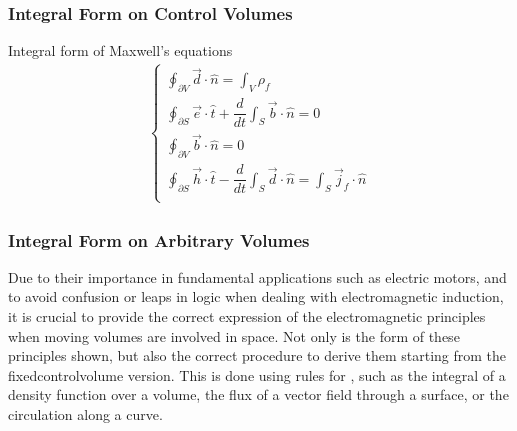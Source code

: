 \documentclass[letterpaper,10pt,english]{jupyterBook}
\begin{document}
\subsubsection{Integral Form on Control Volumes}
\label{\detokenize{ch/principles-matter:integral-form-on-control-volumes}}\label{\detokenize{ch/principles-matter:classical-electromagnetism-media-integral-control-volume}}
\sphinxAtStartPar
Integral form of Maxwell’s equations
\begin{equation*}
\begin{split}\begin{cases}
 \displaystyle \oint_{\partial V} \vec{d} \cdot \hat{n} = \int_{V} \rho_f \\
 \displaystyle \oint_{\partial S} \vec{e} \cdot \hat{t} + \dfrac{d}{dt} \int_S \vec{b} \cdot \hat{n} = 0 \\
 \displaystyle \oint_{\partial V} \vec{b} \cdot \hat{n} = 0 \\
 \displaystyle \oint_{\partial S} \vec{h} \cdot \hat{t} - \dfrac{d}{dt} \int_S \vec{d} \cdot \hat{n} = \int_{S} \vec{j}_f \cdot \hat{n} \\
\end{cases}\end{split}
\end{equation*}

\subsubsection{Integral Form on Arbitrary Volumes}
\label{\detokenize{ch/principles-matter:integral-form-on-arbitrary-volumes}}\label{\detokenize{ch/principles-matter:classical-electromagnetism-media-integral-arbitrary-volume}}
\sphinxAtStartPar
Due to their importance in fundamental applications such as electric motors, and to avoid confusion or leaps in logic when dealing with electromagnetic induction, it is crucial to provide the correct expression of the electromagnetic principles when moving volumes are involved in space. Not only is the form of these principles shown, but also the correct procedure to derive them starting from the fixed\sphinxhyphen{}control\sphinxhyphen{}volume version. This is done using rules for , such as the integral of a density function over a volume, the flux of a vector field through a surface, or the circulation along a curve.
\end{document}
